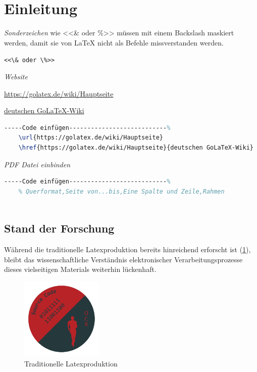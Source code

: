 \section*{Einleitung}

\emph{Sonderzeichen}  wie <<\& oder \%>> müssen mit einem Backslash maskiert werden, damit sie von LaTeX nicht als Befehle missverstanden werden.

\verb|<<\& oder \%>>| 

\emph{Website}

\url{https://golatex.de/wiki/Hauptseite} 

\href{https://golatex.de/wiki/Hauptseite}{deutschen GoLaTeX-Wiki}
\begin{lstlisting}[language=TeX,% C, TeX, Bash, Python
]-----Code einfügen---------------------------%
	\url{https://golatex.de/wiki/Hauptseite}
	\href{https://golatex.de/wiki/Hauptseite}{deutschen GoLaTeX-Wiki}
\end{lstlisting} 

\emph{PDF Datei einbinden}
\begin{lstlisting}[language=TeX,% C, TeX, Bash, Python
]-----Code einfügen---------------------------%
	% Querformat,Seite von...bis,Eine Spalte und Zeile,Rahmen
	
\end{lstlisting}



\clearpage
\subsection*{Stand der Forschung}

Während die traditionelle Latexproduktion bereits hinreichend erforscht ist (\ref{fig:latex}), bleibt das wissenschaftliche Verständnis elektronischer Verarbeitungsprozesse dieses vielseitigen Materials weiterhin lückenhaft. 


\begin{figure}[hb]
	\centering
	\includegraphics[width=0.35\textwidth]{images/logo.pdf}
	\caption{Traditionelle Latexproduktion}\label{fig:latex}%
\end{figure}


